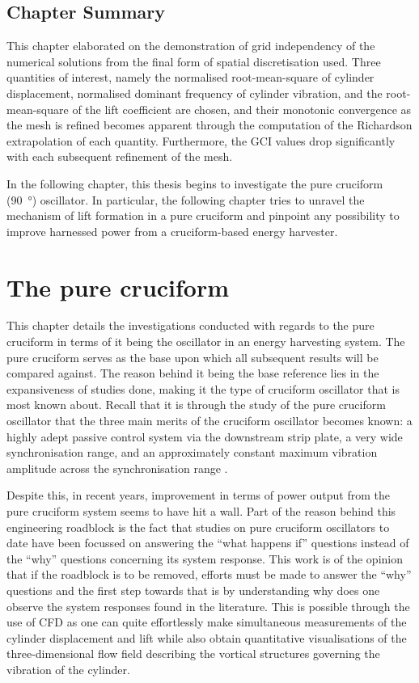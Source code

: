 \documentclass[oneside]{utmthesis}
\begin{document}
\section{Chapter Summary} \label{sec:chapSumValid}
This chapter elaborated on the demonstration of grid independency of the numerical solutions from the final form of spatial discretisation used. Three quantities of interest, namely the normalised root-mean-square of cylinder displacement, normalised dominant frequency of cylinder vibration, and the root-mean-square of the lift coefficient are chosen, and their monotonic convergence as the mesh is refined becomes apparent through the computation of the Richardson extrapolation of each quantity. Furthermore, the GCI values drop significantly with each subsequent refinement of the mesh.

In the following chapter, this thesis begins to investigate the pure cruciform (\SI{90}{\degree}) oscillator. In particular, the following chapter tries to unravel the mechanism of lift formation in a pure cruciform and pinpoint any possibility to improve harnessed power from a cruciform-based energy harvester.

\chapter{The pure cruciform}\label{chap:svivRegime}
This chapter details the investigations conducted with regards to the pure cruciform in terms of it being the oscillator in an energy harvesting system. The pure cruciform serves as the base upon which all subsequent results will be compared against. The reason behind it being the base reference lies in the expansiveness of studies done, making it the type of cruciform oscillator that is most known about. Recall that it is through the study of the pure cruciform oscillator that the three main merits of the cruciform oscillator becomes known: a highly adept passive control system via the downstream strip plate, a very wide synchronisation range, and an approximately constant maximum vibration amplitude across the synchronisation range \citep{Koide2013}.

Despite this, in recent years, improvement in terms of power output from the pure cruciform system seems to have hit a wall. Part of the reason behind this engineering roadblock is the fact that studies on pure cruciform oscillators to date have been focussed on answering the ``what happens if'' questions instead of the ``why'' questions concerning its system response. This work is of the opinion that if the roadblock is to be removed, efforts must be made to answer the ``why'' questions and the first step towards that is by understanding why does one observe the system responses found in the literature. This is possible through the use of CFD as one can quite effortlessly make simultaneous measurements of the cylinder displacement and lift while also obtain quantitative visualisations of the three-dimensional flow field describing the vortical structures governing the vibration of the cylinder.
\end{document}
